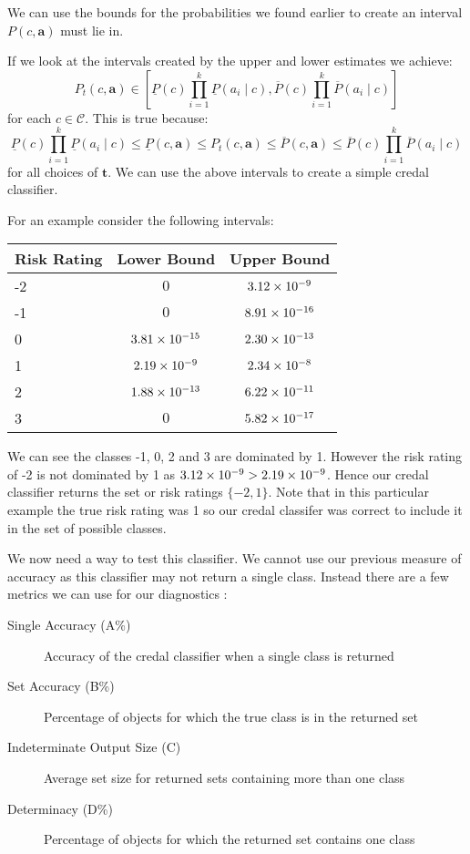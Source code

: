 We can use the bounds for the probabilities we found earlier to create an interval $P(c, \mathbf{a})$ must lie in. 

If we look at the intervals created by the upper and lower estimates we achieve:
\begin{equation}
	P_t(c, \mathbf{a}) \in \left[ \underline{P}(c)\prod_{i=1}^k \underline{P}(a_i \mid c), \overline{P}(c)\prod_{i=1}^k \overline{P}(a_i \mid c) \right]
\end{equation}
for each $c \in \mathcal{C}$.
This is true because:
\begin{equation}
\underline{P}(c)\prod_{i=1}^k \underline{P}(a_i \mid c) \leq \underline{P}(c, \mathbf{a}) \leq P_t(c, \mathbf{a}) \leq \overline{P}(c, \mathbf{a}) \leq \overline{P}(c)\prod_{i=1}^k \overline{P}(a_i \mid c)
\end{equation}
for all choices of $\mathbf{t}$.
We can use the above intervals to create a simple credal classifier.

For an example consider the following intervals:
\begin{center}
	\begin{tabular}{l|c c}
	Risk Rating & Lower Bound & Upper Bound \\
	\hline
	-2          & $0$              & ${3.12}\times 10^{-9}$  \\
	-1          & $0$              & ${8.91}\times 10^{-16}$ \\
	0           & ${3.81}\times 10^{-15}$ & ${2.30}\times 10^{-13}$ \\
	1           & ${2.19}\times 10^{-9}$  & ${2.34}\times 10^{-8}$  \\
	2           & ${1.88}\times 10^{-13}$ & ${6.22}\times 10^{-11}$ \\
	3           & $0$              & ${5.82}\times 10^{-17}$ \\
	\end{tabular}
\end{center}
We can see the classes -1, 0, 2 and 3 are dominated by 1.
However the risk rating of -2 is not dominated by 1 as ${3.12}\times 10^{-9} > {2.19}\times 10^{-9}$.
Hence our credal classifier returns the set or risk ratings $\{-2, 1\}$.
Note that in this particular example the true risk rating was 1 so our credal classifer was correct to include it in the set of possible classes.

We now need a way to test this classifier.
We cannot use our previous measure of accuracy as this classifier may not return a single class.
Instead there are a few metrics we can use for our diagnostics \cite{Antonucci11}:
\begin{description}
	\item[Single Accuracy (A\%)] Accuracy of the credal classifier when a single class is returned
	\item[Set Accuracy (B\%)] Percentage of objects for which the true class is in the returned set
	\item[Indeterminate Output Size (C)] Average set size for returned sets containing more than one class
	\item[Determinacy (D\%)] Percentage of objects for which the returned set contains one class
\end{description}

